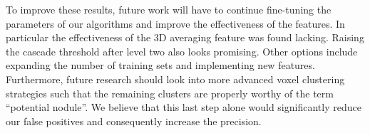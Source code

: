 
To improve these results, future work will have to continue fine-tuning the
parameters of our algorithms and improve the effectiveness of the features. In
particular the effectiveness of the 3D averaging feature was found lacking.
Raising the cascade threshold after level two also looks promising. Other
options include expanding the number of training sets and implementing new
features. Furthermore, future research should look into more advanced voxel
clustering strategies such that the remaining clusters are properly worthy of
the term ``potential nodule''. We believe that this last step alone would
significantly reduce our false positives and consequently increase the
precision.

